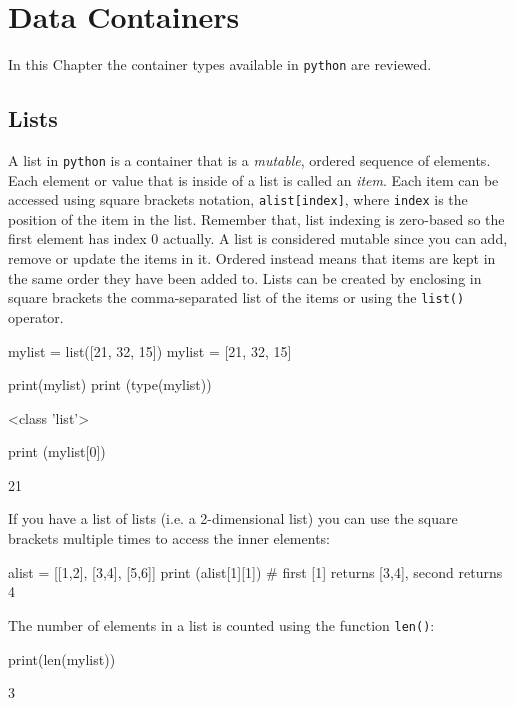 \chapter{Data Containers}
\label{sec:datacontainer}

In this Chapter the container types available in \texttt{python} are reviewed.

\section{Lists}
\label{lists}

A list in \texttt{python} is a container that is a \emph{mutable}, ordered sequence of elements. Each element or value that is inside of a list is called an \emph{item}. Each item can be accessed using square brackets notation, \texttt{alist[index]}, where \texttt{index} is the position of the item in the list.
Remember that, list indexing is zero-based so the first element has index 0 actually. A list is considered mutable since you can add, remove or update the items in it. Ordered instead means that items are kept in the same order they have been added to. Lists can be created by enclosing in square brackets the comma-separated list of the items or using the \texttt{list()} operator.

\begin{ipython}
mylist = list([21, 32, 15])
mylist = [21, 32, 15]

print(mylist)
print (type(mylist))
\end{ipython}
\begin{ioutput}
[21, 32, 15]
<class 'list'>
\end{ioutput}

\begin{ipython}
print (mylist[0])
\end{ipython}
\begin{ioutput}
21
\end{ioutput}

If you have a list of lists (i.e. a 2-dimensional list) you can use the square brackets multiple times to access the inner elements:
\begin{ipython}
alist = [[1,2], [3,4], [5,6]]
print (alist[1][1]) # first [1] returns [3,4], second returns 4                 
\end{ipython}  

The number of elements in a list is counted using the function \texttt{len()}:
\begin{ipython}
print(len(mylist))
\end{ipython}
\begin{ioutput}
3
\end{ioutput}

